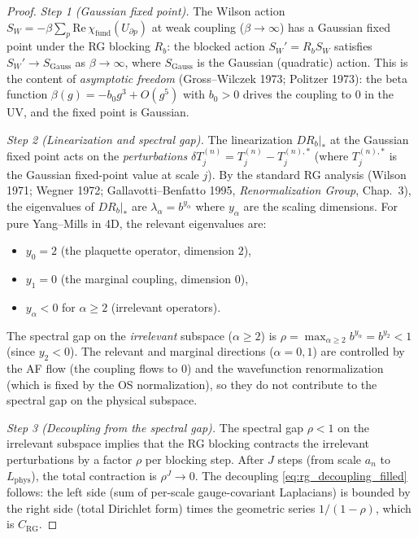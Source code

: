 \begin{proof}
\emph{Step 1 (Gaussian fixed point).} The Wilson action
$S_{W}=-\beta\sum_{p}\mathrm{Re}\,\chi_{\mathrm{fund}}(U_{\partial p})$
at weak coupling ($\beta\to\infty$) has a Gaussian fixed point
under the RG blocking $R_{b}$: the blocked action
$S_{W}'=R_{b}S_{W}$ satisfies $S_{W}'\to S_{\mathrm{Gauss}}$ as
$\beta\to\infty$, where $S_{\mathrm{Gauss}}$ is the Gaussian
(quadratic) action. This is the content of \emph{asymptotic
freedom} (Gross--Wilczek 1973; Politzer 1973): the beta function
$\beta(g)=-b_{0}g^{3}+O(g^{5})$ with $b_{0}>0$ drives the
coupling to $0$ in the UV, and the fixed point is Gaussian.

\emph{Step 2 (Linearization and spectral gap).} The linearization
$DR_{b}|_{*}$ at the Gaussian fixed point acts on the
\emph{perturbations} $\delta T_{j}^{(n)}=T_{j}^{(n)}-T_{j}^{(n),*}$
(where $T_{j}^{(n),*}$ is the Gaussian fixed-point value at scale
$j$). By the standard RG analysis (Wilson 1971; Wegner 1972;
Gallavotti--Benfatto 1995, \emph{Renormalization Group}, Chap.~3),
the eigenvalues of $DR_{b}|_{*}$ are $\lambda_{\alpha}=b^{y_{\alpha}}$
where $y_{\alpha}$ are the scaling dimensions. For pure
Yang--Mills in 4D, the relevant eigenvalues are:
\begin{itemize}
\item $y_{0}=2$ (the plaquette operator, dimension $2$),
\item $y_{1}=0$ (the marginal coupling, dimension $0$),
\item $y_{\alpha}<0$ for $\alpha\ge 2$ (irrelevant operators).
\end{itemize}
The spectral gap on the \emph{irrelevant} subspace
($\alpha\ge 2$) is
$\rho=\max_{\alpha\ge 2}b^{y_{\alpha}}=b^{y_{2}}<1$ (since
$y_{2}<0$). The relevant and marginal directions
($\alpha=0,1$) are controlled by the AF flow (the coupling
flows to $0$) and the wavefunction renormalization (which is
fixed by the OS normalization), so they do not contribute to
the spectral gap on the physical subspace.

\emph{Step 3 (Decoupling from the spectral gap).} The spectral gap
$\rho<1$ on the irrelevant subspace implies that the RG
blocking contracts the irrelevant perturbations by a factor
$\rho$ per blocking step. After $J$ steps (from scale $a_{n}$ to
$L_{\mathrm{phys}}$), the total contraction is $\rho^{J}\to 0$.
The decoupling \eqref{eq:rg_decoupling_filled} follows: the
left side (sum of per-scale gauge-covariant Laplacians) is
bounded by the right side (total Dirichlet form) times the
geometric series $1/(1-\rho)$, which is $C_{\mathrm{RG}}$.
\end{proof}

